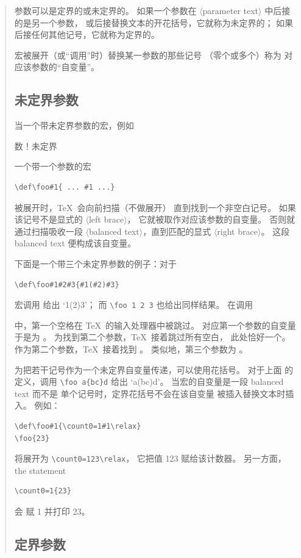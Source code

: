\documentclass[a4paper]{rapport3}
\def\gr#1{$\langle$#1$\rangle$}\def\key#1{{\tt#1}}
\newenvironment{disp}{\begin{quotation}}{\end{quotation}}
\def\term#1\par{\index{#1}}
\begin{document}
\begin{disp}
参数可以是定界的或未定界的。
如果一个参数在 \gr{parameter text} 中后接的是另一个参数，
或后接替换文本的开花括号，它就称为未定界的；
如果后接任何其他记号，它就称为定界的。

宏被展开（或“调用”时）替换某一参数的那些记号
（零个或多个）称为
对应该参数的“自变量”。

\subsection{未定界参数}

当一个带未定界参数的宏，例如
\term 参数！未定界\par
一个带一个参数的宏 
\begin{verbatim}
\def\foo#1{ ... #1 ...}
\end{verbatim}
被展开时，\TeX\ 会向前扫描（不做展开）
直到找到一个非空白记号。
如果该记号不是显式的 \gr{left brace}，
它就被取作对应该参数的自变量。
否则就通过扫描吸收一段 \gr{balanced text}，直到匹配的显式
\gr{right brace}。
这段 balanced text 便构成该自变量。

下面是一个带三个未定界参数的例子：对于
\begin{verbatim}
\def\foo#1#2#3{#1(#2)#3}
\end{verbatim}
宏调用  给出 `\hbox{1(2)3}'；
而 \hbox{\verb-\foo 1 2 3-} 也给出同样结果。
在调用
\begin{disp}\end{disp}
中，第一个空格在 \TeX\ 的输入处理器中被跳过。
对应第一个参数的自变量于是为 。
为找到第二个参数，\TeX\ 接着跳过所有空白，
此处恰好一个。作为第二个参数，\TeX\ 接着找到 。
类似地，第三个参数为 。


为把若干记号作为一个未定界自变量传递，可以使用花括号。
对于上面  的定义，调用 \verb>\foo a{bc}d> 给出 `\hbox{a(bc)d}'。
当宏的自变量是一段 balanced text 而不是
单个记号时，定界花括号不会在该自变量
被插入替换文本时插入。
例如：\begin{verbatim}
\def\foo#1{\count0=1#1\relax}
\foo{23}
\end{verbatim}
将展开为 \verb>\count0=123\relax>，
它把值 123 赋给该计数器。
另一方面，  the statement \begin{verbatim}
\count0=1{23}
\end{verbatim}
会
赋 1 并打印 23。

\subsection{定界参数}


\end{disp}
\end{document}

